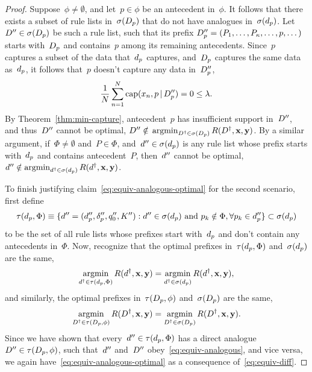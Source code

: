 \begin{proof}
Suppose~${\phi \neq \emptyset}$, and let~${p \in \phi}$
be an antecedent in~$\phi$.
%
It follows that there exists a subset of rule lists
in~$\sigma(D_p)$ that do not have analogues
in~$\sigma(d_p)$.
%
Let~${{D}'' \in \sigma(D_p)}$ be such a rule list,
such that its prefix ${D_p'' = (P_1, \dots, P_\kappa, \dots, p, \dots)}$
starts with~$D_p$ and contains~$p$ among its remaining antecedents.
%
Since~$p$ captures a subset of the data that~$d_p$ captures,
and~$D_p$ captures the same data as~$d_p$,
it follows that~$p$ doesn't capture any data in~$D_p''$, \ie
\begin{align}
\frac{1}{N} \sum_{n=1}^N \Cap(x_n, p \given \PrefixB'') = 0 \le \Reg.
\end{align}
By Theorem~\ref{thm:min-capture}, antecedent~$p$ has insufficient
support in~${D}''$, and thus~${D}''$ cannot be optimal, \ie
${{D}'' \notin}$ ${\operatorname*{argmin}_{{D}^\dagger \in \sigma(D_p)} R({D}^\dagger, \mathbf{x}, \mathbf{y})}$.
%
By a similar argument, if~${\Phi \neq \emptyset}$
and~${P \in \Phi}$, and~${{d}'' \in \sigma(d_p)}$
is any rule list whose prefix starts with~$d_p$
and contains antecedent~$P$, then~${d}''$ cannot be optimal, \ie
${{d}'' \notin \operatorname*{argmin}_{{d}^\dagger \in \sigma(d_p)} R({d}^\dagger, \mathbf{x}, \mathbf{y})}$.

To finish justifying claim~\eqref{eq:equiv-analogous-optimal}
for the second scenario, first define
\begin{align}
\tau(\Prefix, \Phi) \equiv
  \{\RL'' = (\Prefix'', \Labels'', \Default'', K'') :
    \RL'' \in \StartsWith(\Prefix) \textnormal{ and }
    p_k \notin \Phi, \forall p_k \in \Prefix''\} \subset \StartsWith(\Prefix)
\end{align}
to be the set of all rule lists whose prefixes start with~$d_p$
and don't contain any antecedents in~$\Phi$.
%
Now, recognize that the optimal prefixes in~$\tau(d_p, \Phi)$
and~$\sigma(d_p)$ are the same, \ie
\begin{align}
\argmin_{\RL^\dagger \in \tau(\Prefix, \Phi)} \Obj(\RL^\dagger, \x, \y)
= \argmin_{\RL^\dagger \in \StartsWith(\Prefix)} \Obj(\RL^\dagger, \x, \y),
\end{align}
and similarly, the optimal prefixes in~$\tau(D_p, \phi)$
and~$\sigma(D_p)$ are the same, \ie
\begin{align}
\argmin_{\RLB^\dagger \in \tau(\PrefixB, \phi)} \Obj(\RLB^\dagger, \x, \y)
= \argmin_{\RLB^\dagger \in \StartsWith(\PrefixB)} \Obj(\RLB^\dagger, \x, \y).
\end{align}
Since we have shown that every~${{d}'' \in \tau(d_p, \Phi)}$
has a direct analogue~${{D}'' \in \tau(D_p, \phi)}$,
such that~${d}''$ and~${D}''$ obey~\eqref{eq:equiv-analogous},
and vice versa, we again have~\eqref{eq:equiv-analogous-optimal}
as a consequence of~\eqref{eq:equiv-diff}.


\end{proof}
